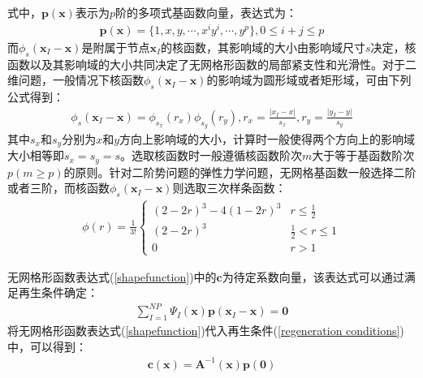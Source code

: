 式中，$\pmb{p}(\pmb{x})$表示为$p$阶的多项式基函数向量，表达式为：
\begin{equation}
\begin{split}
    \pmb{p}(\pmb{x})=\{1,x,y,\dotsb,x^iy^i,\dotsb,y^p\},0\le i+j \le p
\end{split}
\end{equation}
而$\phi_s(\pmb{x}_I-\pmb{x})$是附属于节点$\pmb{x}_I$的核函数，其影响域的大小由影响域尺寸$s$决定，核函数以及其影响域的大小共同决定了无网格形函数的局部紧支性和光滑性。对于二维问题，一般情况下核函数$\phi_s(\pmb{x}_I-\pmb{x})$的影响域为圆形域或者矩形域，可由下列公式得到：
\begin{equation}
\begin{split}
    \phi_s(\pmb{x}_I-\pmb{x})=\phi_{s_x}(r_x)\phi_{s_y}(r_y),r_x=\frac{\lvert x_I-x\rvert}{s_x},r_y=\frac{\lvert y_I-y \rvert}{s_y}
\end{split}
\end{equation}
其中$s_x$和$s_y$分别为$x$和$y$方向上影响域的大小，计算时一般使得两个方向上的影响域大小相等即$s_x=s_y=s$。选取核函数时一般遵循核函数阶次$m$大于等于基函数阶次$p(m\ge p)$的原则。针对二阶势问题的弹性力学问题，无网格基函数一般选择二阶或者三阶，而核函数$\phi_s(\pmb{x}_I-\pmb{x})$则选取三次样条函数：
\begin{equation}
\begin{split}
    \phi(r)=\frac{1}{3!}
\begin{cases}
    (2-2r)^3-4(1-2r)^3 &r\le \frac{1}{2}\\
    (2-2r)^3&\frac{1}{2}<r\le 1\\
    0&r>1
\end{cases}
\end{split}
\end{equation}\par
无网格形函数表达式(\ref{shapefunction})中的$\pmb{c}$为待定系数向量，该表达式可以通过满足再生条件确定：
\begin{equation}\label{regeneration conditions}
\begin{split}
    \sum_{I=1}^{N\!P}\Psi_I(\pmb{x})\pmb{p}(\pmb{x}_I-\pmb{x})=\pmb{0}
\end{split}
\end{equation}
将无网格形函数表达式(\ref{shapefunction})代入再生条件(\ref{regeneration conditions})中，可以得到：
\begin{equation}
\begin{split}
    \pmb{c}(\pmb{x})=\pmb{A}^{-1}(\pmb{x})\pmb{p}(\pmb{0})
\end{split}
\end{equation}
